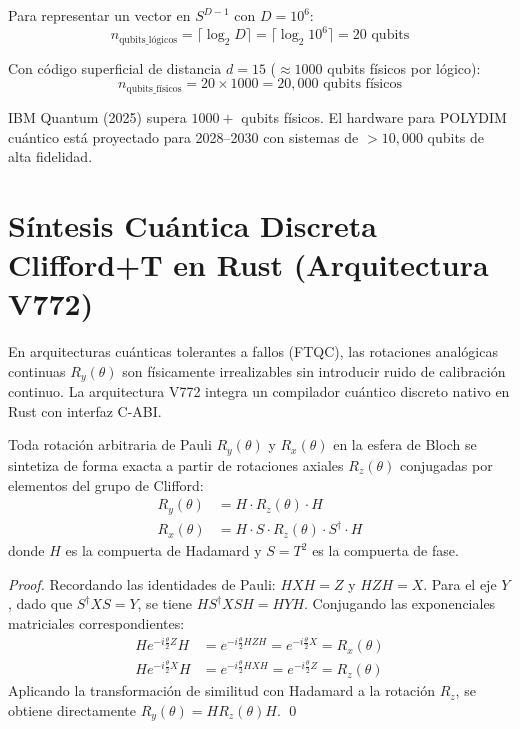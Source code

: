 Para representar un vector en $S^{D-1}$ con $D = 10^6$:
\begin{equation}
n_{\text{qubits\_lógicos}} = \lceil \log_2 D \rceil = \lceil \log_2 10^6 \rceil = 20 \text{ qubits}
\end{equation}

Con código superficial de distancia $d = 15$ ($\approx 1000$ qubits físicos por lógico):
\begin{equation}
n_{\text{qubits\_físicos}} = 20 \times 1000 = 20{,}000 \text{ qubits físicos}
\end{equation}

IBM Quantum (2025) supera $1000+$ qubits físicos. El hardware para POLYDIM cuántico
está proyectado para 2028--2030 con sistemas de $>10{,}000$ qubits de alta fidelidad.

\section{Síntesis Cuántica Discreta Clifford+T en Rust (Arquitectura V772)}
\label{sec:discrete_clifford_t}

En arquitecturas cuánticas tolerantes a fallos (FTQC), las rotaciones analógicas continuas $R_y(\theta)$ son físicamente irrealizables sin introducir ruido de calibración continuo. La arquitectura V772 integra un compilador cuántico discreto nativo en Rust con interfaz C-ABI.

\begin{theorem}
\label{thm:clifford_canonical}
Toda rotación arbitraria de Pauli $R_y(\theta)$ y $R_x(\theta)$ en la esfera de Bloch se sintetiza de forma exacta a partir de rotaciones axiales $R_z(\theta)$ conjugadas por elementos del grupo de Clifford:
\begin{align}
R_y(\theta) &= H \cdot R_z(\theta) \cdot H \\
R_x(\theta) &= H \cdot S \cdot R_z(\theta) \cdot S^\dagger \cdot H
\end{align}
donde $H$ es la compuerta de Hadamard y $S = T^2$ es la compuerta de fase.
\end{theorem}

\begin{proof}
Recordando las identidades de Pauli: $H X H = Z$ y $H Z H = X$. Para el eje $Y$, dado que $S^\dagger X S = Y$, se tiene $H S^\dagger X S H = H Y H$. Conjugando las exponenciales matriciales correspondientes:
\begin{align}
H e^{-i \frac{\theta}{2} Z} H &= e^{-i \frac{\theta}{2} H Z H} = e^{-i \frac{\theta}{2} X} = R_x(\theta) \\
H e^{-i \frac{\theta}{2} X} H &= e^{-i \frac{\theta}{2} H X H} = e^{-i \frac{\theta}{2} Z} = R_z(\theta)
\end{align}
Aplicando la transformación de similitud con Hadamard a la rotación $R_z$, se obtiene directamente $R_y(\theta) = H R_z(\theta) H$. \qed
\end{proof}

